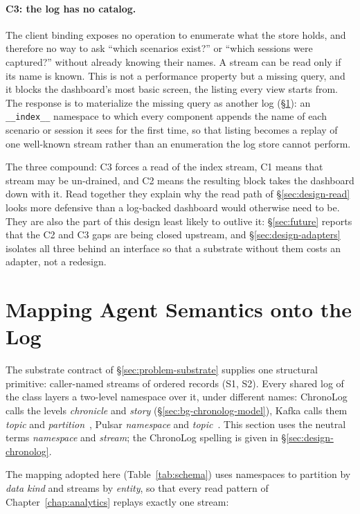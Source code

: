 \paragraph{C3: the log has no catalog.} The client binding
exposes no operation to enumerate what the store holds, and therefore no way
to ask ``which scenarios exist?'' or ``which sessions were captured?''
without already knowing their names. A stream can be read only if its
name is known. This is not a
performance property but a missing query, and it blocks the dashboard's most
basic screen, the listing every view starts from. The response is to
materialize the missing query as another log
(\S\ref{sec:design-mapping}): an \texttt{\_\_index\_\_} namespace to which
every component appends the name of each scenario or session it sees for the
first time, so that listing becomes a replay of one well-known stream rather
than an enumeration the log store cannot perform.

The three compound: C3 forces a read of the index stream, C1 means that
stream may be un-drained, and C2 means the resulting block takes the
dashboard down with it. Read together they explain why the read path of
\S\ref{sec:design-read} looks more defensive than a log-backed dashboard
would otherwise need to be. They are also the part of this design least
likely to outlive it: \S\ref{sec:future} reports that the C2 and C3 gaps are
being closed upstream, and \S\ref{sec:design-adapters} isolates all three
behind an interface so that a substrate without them costs an adapter, not a
redesign.

\section{Mapping Agent Semantics onto the Log}
\label{sec:design-mapping}

The substrate contract of \S\ref{sec:problem-substrate} supplies one
structural primitive: caller-named streams of ordered records (S1, S2).
Every shared log of the class layers a two-level namespace over it, under
different names: ChronoLog calls the levels \emph{chronicle} and
\emph{story} (\S\ref{sec:bg-chronolog-model}), Kafka calls them
\emph{topic} and \emph{partition}~\cite{kreps2011kafka}, Pulsar
\emph{namespace} and \emph{topic}~\cite{pulsar}. This section uses the
neutral terms \emph{namespace} and \emph{stream}; the ChronoLog spelling is
given in \S\ref{sec:design-chronolog}.

The mapping adopted here
(Table~\ref{tab:schema}) uses namespaces to partition by \emph{data kind}
and streams by \emph{entity}, so that every read pattern of
Chapter~\ref{chap:analytics} replays exactly one stream:

